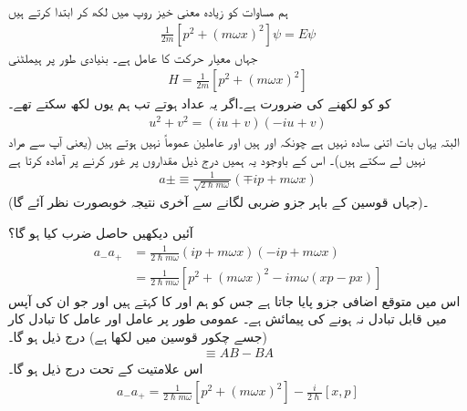 ہم مساوات  کو زیادہ معنی خیز روپ میں لکھ کر ابتدا کرتے ہیں
\begin{align}
\frac{1}{2m}[p^{2}+(m\omega x)^{2}]\psi=E\psi
\end{align}
جہاں  معیار حرکت کا عامل ہے۔ بنیادی طور پر  ہیملٹنی
\begin{align}
H=\frac{1}{2m}[p^{2}+(m\omega x)^{2}]
\end{align}
کو  کو  لکھنے کی ضرورت ہے۔اگر یہ عداد ہوتے تب ہم یوں لکھ سکتے تھے۔
\begin{align*}
u^{2}+v^{2}=(iu+v)(-iu+v)
\end{align*}
البتہ  یہاں بات اتنی سادہ نہیں ہے چونکہ  اور   ہیں اور  عاملین عموماً   نہیں ہوتے ہیں (یعنی آپ  سے مراد  نہیں لے سکتے ہیں)۔ اس کے باوجود یہ ہمیں درج ذیل مقداروں پر غور کرنے پر آمادہ  کرتا ہے
\begin{align}\label{مساوات_شروڈنگر_تعریفات_سیڑھی}
a\pm\equiv \frac{1}{\sqrt{2\hslash m\omega}}(\mp ip+m\omega x)
\end{align}
(جہاں قوسین کے باہر جزو ضربی لگانے سے آخری نتیجہ خوبصورت نظر آئے گا)۔

آئیں دیکھیں حاصل ضرب   کیا ہو گا؟
\begin{align*}
a_{-}a_{+}&=\frac{1}{2\hslash m\omega}(ip+m\omega x)(-ip+m\omega x)\\
&=\frac{1}{2\hslash m\omega}[p^{2}+(m\omega x)^{2}-im\omega(xp-px)]
\end{align*}
اس میں متوقع اضافی جزو  پایا جاتا ہے جس کو ہم  اور  کا   کہتے ہیں اور جو ان کی آپس میں قابل تبادل نہ  ہونے کی پیمائش ہے۔ عمومی طور پر عامل  اور عامل  کا تبادل کار (جسے چکور قوسین میں لکھا ہے) درج ذیل ہو گا۔
\begin{align}
[A,B]\equiv AB-BA
\end{align}
اس علامتیت کے تحت درج ذیل ہو گا۔
\begin{align}\label{مساوات_شروڈنگر_سیڑھی_حاصل_ضرب}
a_{-}a_{+}=\frac{1}{2\hslash m\omega}[p^{2}+(m\omega x)^{2}]-\frac{i}{2\hslash}[x,p]
\end{align}

